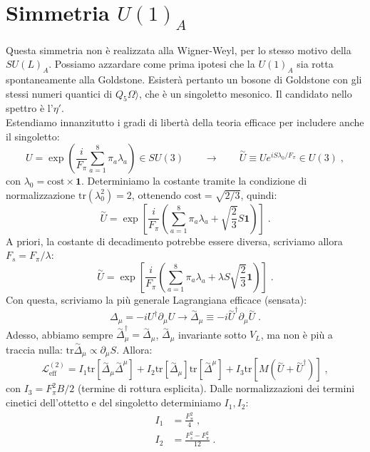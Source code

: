 \documentclass[12pt,a4paper]{article}
\theoremstyle{definition}
\newcommand{\lag}{\mathcal{L}}
\newcommand{\ket}{\rangle}
\newcommand{\adj}[1]{#1^{\dagger}}
\newcommand{\tr}{\mathrm{tr}}
\numberwithin{equation}{section}
\begin{document}
\section{Simmetria $U(1)_A$}
Questa simmetria non è realizzata alla Wigner-Weyl, per lo stesso motivo della $SU(L)_A$. Possiamo azzardare come prima ipotesi che la $U(1)_A$ sia rotta spontaneamente alla Goldstone. Esisterà pertanto un bosone di Goldstone con gli stessi numeri quantici di $Q_5\Omega\ket$, che è un singoletto mesonico. Il candidato nello spettro è l'$\eta'$. \\
Estendiamo innanzitutto i gradi di libertà della teoria efficace per includere anche il singoletto:
\begin{equation}
U=\exp\left(\frac{i}{F_{\pi}}\sum_{a=1}^8\pi_a\lambda_a\right)\in SU(3) \qquad \longrightarrow\qquad  \stackrel{\sim}{U}\equiv Ue^{iS\lambda_0/F_{\pi}}\in U(3)\;,
\end{equation}
con $\lambda_0=\mathrm{cost}\times \mathbf{1}$. Determiniamo la costante tramite la condizione di normalizzazione $\tr(\lambda_0^2)=2$, ottenendo $\mathrm{cost}=\sqrt{2/3}$, quindi:
\begin{equation*}
\stackrel{\sim}{U}=\exp\left[\frac{i}{F_{\pi}}\left(\sum_{a=1}^8\pi_a\lambda_a+\sqrt{\frac{2}{3}}S\mathbf{1}\right)\right]\;.
\end{equation*}
A priori, la costante di decadimento potrebbe essere diversa, scriviamo allora $F_s=F_{\pi}/\lambda$:
\begin{equation}
\boxed{
\stackrel{\sim}{U}=\exp\left[\frac{i}{F_{\pi}}\left(\sum_{a=1}^8\pi_a\lambda_a+\lambda S\sqrt{\frac{2}{3}}\mathbf{1}\right)\right]
}\;.
\end{equation}
Con questa, scriviamo la più generale Lagrangiana efficace (sensata):
$$
\Delta_{\mu}=-i\adj{U}\partial_{\mu}U \longrightarrow \stackrel{\sim}{\Delta}_{\mu}\equiv -i\adj{\stackrel{\sim}{U}}\partial_{\mu}\stackrel{\sim}{U}\;.
$$
Adesso, abbiamo sempre $\adj{\stackrel{\sim}{\Delta}_{\mu}}=\stackrel{\sim}{\Delta}_{\mu}$, $\stackrel{\sim}{\Delta}_{\mu}$ invariante sotto $V_L$, ma non è più a traccia nulla:  $\tr\stackrel{\sim}{\Delta}_{\mu}\propto\partial_{\mu}S$. Allora:
$$
\lag_{\mathrm{eff}}^{(2)}=I_1\tr\left[\stackrel{\sim}{\Delta}_{\mu}\stackrel{\sim}{\Delta}^{\mu}\right]+I_2\tr[\stackrel{\sim}{\Delta}_{\mu}]\tr[\stackrel{\sim}{\Delta}^{\mu}]+I_3\tr[M(\stackrel{\sim}{U}+\adj{\stackrel{\sim}{U}})]\;,
$$
con $I_3=F_{\pi}^2B/2$ (termine di rottura esplicita). Dalle normalizzazioni dei termini cinetici dell'ottetto e del singoletto determiniamo $I_1,I_2$:
\begin{align*}
I_1 &= \frac{F_{\pi}^2}{4}\;, \\
I_2 &= \frac{F_s^2-F_{\pi}^2}{12}\;.
\end{align*}
\end{document}

